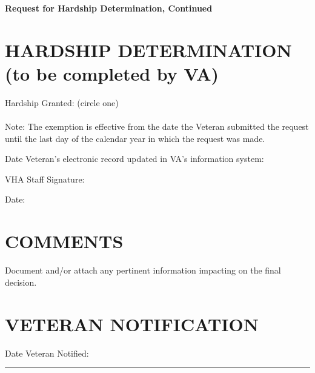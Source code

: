 \documentclass[11pt]{article}
\begin{document}
\noindent \textbf{Request for Hardship Determination, Continued}

\section*{HARDSHIP DETERMINATION (to be completed by VA)}
Hardship Granted: (circle one) \\
 \\
\hspace*{6mm}Note: The exemption is effective from the date the Veteran submitted the request until the last day of the calendar year in which the request was made. \\

\vspace{2mm} %
Date Veteran's electronic record updated in VA's information system: \hrulefill

\vspace{2mm} %
VHA Staff Signature: \hrulefill

\vspace{2mm} %
Date: \hrulefill

\section*{COMMENTS}
Document and/or attach any pertinent information impacting on the final decision.
\hrulefill %
\hrulefill %

\section*{VETERAN NOTIFICATION}
Date Veteran Notified: \hrule
\end{document}
